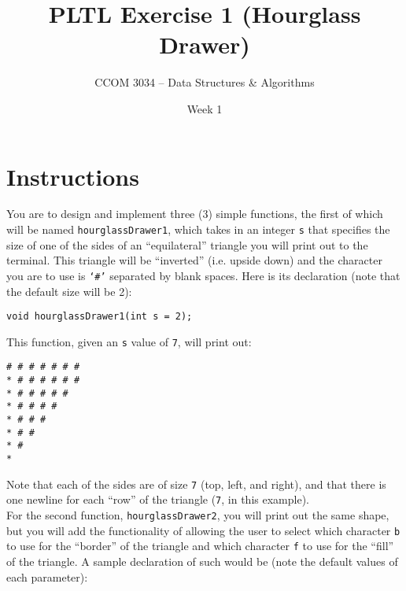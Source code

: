 \documentclass[11 pt]{article}
\title{PLTL Exercise 1 (Hourglass Drawer)}
\author{CCOM 3034 – Data Structures \& Algorithms}
\date{Week 1}
\begin{document}

\maketitle

\section{Instructions}

You are to design and implement three (3) simple functions, the first of which will be named \texttt{hourglassDrawer1}, which takes in an integer \texttt{s} that specifies the size of one of the sides of an ``equilateral'' triangle you will print out to the terminal. This triangle will be ``inverted'' (i.e. upside down) and the character you are to use is \texttt{`\#'} separated by blank spaces. Here is its declaration (note that the default size will be 2):

\begin{center}
    \texttt{void hourglassDrawer1(int s = 2);}
\end{center}

\noindent This function, given an \texttt{s} value of \texttt{7}, will print out:

\begin{center}
    \texttt{\# \# \# \# \# \# \# \\* \# \# \# \# \# \# \\*  \# \# \# \# \# \\*   \# \# \# \# \\*    \# \# \# \\*     \# \# \\*      \# \\*}
\end{center}

\noindent Note that each of the sides are of size \texttt{7} (top, left, and right), and that there is one newline for each ``row'' of the triangle (\texttt{7}, in this example). \\

\noindent For the second function, \texttt{hourglassDrawer2}, you will print out the same shape, but you will add the functionality of allowing the user to select which character \texttt{b} to use for the ``border'' of the triangle and which character \texttt{f} to use for the ``fill'' of the triangle. A sample declaration of such would be (note the default values of each parameter):
\end{document}
